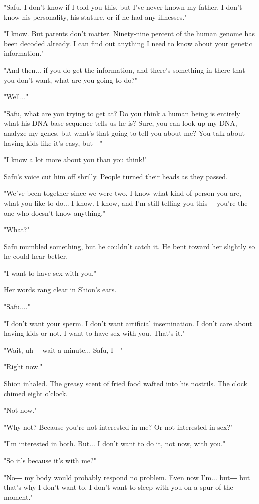 "Safu, I don't know if I told you this, but I've never known my father.
I don't know his personality, his stature, or if he had any illnesses."

"I know. But parents don't matter. Ninety-nine percent of the human
genome has been decoded already. I can find out anything I need to know
about your genetic information."

"And then... if you do get the information, and there's something in
there that you don't want, what are you going to do?"

"Well..."

"Safu, what are you trying to get at? Do you think a human being is
entirely what his DNA base sequence tells us he is? Sure, you can look
up my DNA, analyze my genes, but what's that going to tell you about me?
You talk about having kids like it's easy, but―"

"I know a lot more about you than you think!"

Safu's voice cut him off shrilly. People turned their heads as they
passed.

"We've been together since we were two. I know what kind of person you
are, what you like to do... I know. I know, and I'm still telling you
this― you're the one who doesn't know anything."

"What?"

Safu mumbled something, but he couldn't catch it. He bent toward her
slightly so he could hear better.

"I want to have sex with you."

Her words rang clear in Shion's ears.~

"Safu...."

"I don't want your sperm. I don't want artificial insemination. I don't
care about having kids or not. I want to have sex with you. That's it."

"Wait, uh― wait a minute... Safu, I―"

"Right now."

Shion inhaled. The greasy scent of fried food wafted into his nostrils.
The clock chimed eight o'clock.

"Not now."

"Why not? Because you're not interested in me? Or not interested in
sex?"

"I'm interested in both. But... I don't want to do it, not now, with
you."

"So it's because it's with me?"

"No― my body would probably respond no problem. Even now I'm... but― but
that's why I don't want to. I don't want to sleep with you on a spur of
the moment."

